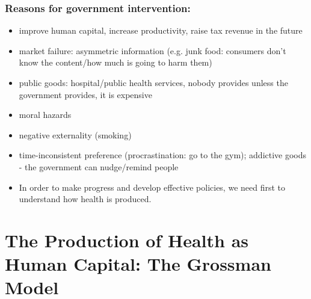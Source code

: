 \subsubsection{Reasons for government intervention:}          
\begin{itemize}           
        \item improve human capital, increase productivity, raise tax revenue in the future
        \item market failure: asymmetric information (e.g. junk food: consumers don't know the content/how much is going to harm them)
        \item public goods: hospital/public health services, nobody provides unless the government provides, it is expensive
        \item moral hazards
        \item negative externality (smoking)
        \item time-inconsistent preference (procrastination: go to the gym); addictive goods - the government can nudge/remind people
        \item In order to make progress and develop effective policies, we need first to understand how health is produced.
\end{itemize} 

\section{The Production of Health as Human Capital: The Grossman Model}
